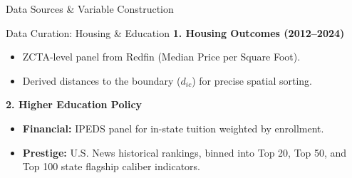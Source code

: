 \documentclass[10pt, aspectratio=169]{beamer}
\begin{document}
\begin{frame}{Data Sources \& Variable Construction}
    \begin{table}
        \centering
        \caption{Data Sources and Variable Construction}
    \end{table}
\end{frame}


\begin{frame}{Data Curation: Housing \& Education}
    \textbf{1. Housing Outcomes (2012--2024)}
    \begin{itemize}
        \item ZCTA-level panel from Redfin (Median Price per Square Foot).
        \item Derived distances to the boundary ($d_{ic}$) for precise spatial sorting.
    \end{itemize}
    
    \vspace{0.3cm}
    \textbf{2. Higher Education Policy}
    \begin{itemize}
        \item \textbf{Financial:} IPEDS panel for in-state tuition weighted by enrollment.
        \item \textbf{Prestige:} U.S. News historical rankings, binned into Top 20, Top 50, and Top 100 state flagship caliber indicators.
    \end{itemize}
\end{frame}
\end{document}

